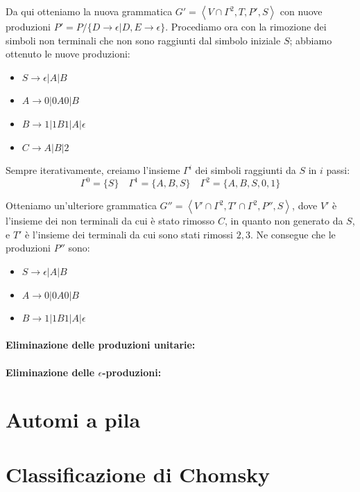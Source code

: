 \noindent Da qui otteniamo la nuova grammatica $G' = \left<V\cap \Gamma^2, T, P', S\right>$ con nuove produzioni $P' = P / \{D\to \epsilon | D,
E\to \epsilon\}$. Procediamo ora con la rimozione dei simboli non terminali che non sono raggiunti dal simbolo iniziale $S$; abbiamo ottenuto le nuove
produzioni: \begin{itemize}
    \item $S \to \epsilon|A|B$
    \item $A \to 0|0A0|B$
    \item $B \to 1|1B1|A|\epsilon$
    \item $C \to A|B|2$
\end{itemize}

\noindent Sempre iterativamente, creiamo l'insieme $\Gamma^i$ dei simboli raggiunti da $S$ in $i$ passi: \[
    \Gamma^0 = \{S\}\quad \Gamma^1 = \{A, B, S\}\quad \Gamma^2 = \{A, B, S, 0, 1\}
\]

\noindent Otteniamo un'ulteriore grammatica $G'' = \left<V'\cap \Gamma^2, T' \cap \Gamma^2, P'', S \right>$, dove $V'$ è l'insieme dei non terminali da
cui è stato rimosso $C$, in quanto non generato da $S$, e $T'$ è l'insieme dei terminali da cui sono stati rimossi $2,3$. Ne consegue che le produzioni
$P''$ sono: \begin{itemize}
    \item $S \to \epsilon|A|B$
    \item $A \to 0|0A0|B$
    \item $B \to 1|1B1|A|\epsilon$
\end{itemize}


\paragraph{Eliminazione delle produzioni unitarie:}

\paragraph{Eliminazione delle $\epsilon$-produzioni:}

%

\section{Automi a pila}

%

\section{Classificazione di Chomsky}